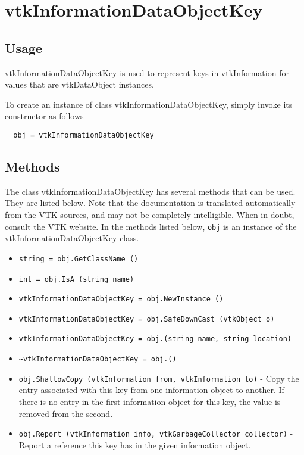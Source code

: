 \section{vtkInformationDataObjectKey}

\subsection{Usage}

 vtkInformationDataObjectKey is used to represent keys in
 vtkInformation for values that are vtkDataObject instances.

To create an instance of class vtkInformationDataObjectKey, simply
invoke its constructor as follows
\begin{verbatim}
  obj = vtkInformationDataObjectKey
\end{verbatim}
\subsection{Methods}

The class vtkInformationDataObjectKey has several methods that can be used.
  They are listed below.
Note that the documentation is translated automatically from the VTK sources,
and may not be completely intelligible.  When in doubt, consult the VTK website.
In the methods listed below, \verb|obj| is an instance of the vtkInformationDataObjectKey class.
\begin{itemize}
\item  \verb|string = obj.GetClassName ()|

\item  \verb|int = obj.IsA (string name)|

\item  \verb|vtkInformationDataObjectKey = obj.NewInstance ()|

\item  \verb|vtkInformationDataObjectKey = obj.SafeDownCast (vtkObject o)|

\item  \verb|vtkInformationDataObjectKey = obj.(string name, string location)|

\item  \verb|~vtkInformationDataObjectKey = obj.()|

\item  \verb|obj.ShallowCopy (vtkInformation from, vtkInformation to)| -  Copy the entry associated with this key from one information
 object to another.  If there is no entry in the first information
 object for this key, the value is removed from the second.

\item  \verb|obj.Report (vtkInformation info, vtkGarbageCollector collector)| -  Report a reference this key has in the given information object.

\end{itemize}
